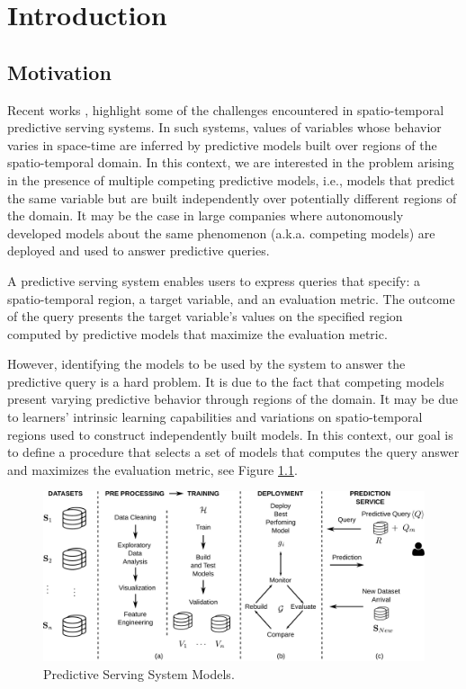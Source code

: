 \chapter[Introduction]{Introduction}\label{chap_intro}

\section{Motivation}
\label{Sec:Motivation}

Recent works \cite{Ghanta022019, Crankshaw2017, Polyzotis2018}, highlight some of the challenges encountered in spatio-temporal predictive serving systems. In such systems, values of variables whose behavior varies in space-time are inferred by predictive models built over regions of the spatio-temporal domain. In this context, we are interested in the problem arising in the presence of multiple competing predictive models, i.e., models that predict the same variable but are built independently over potentially different regions of the domain. It may be the case in large companies where autonomously developed models about the same phenomenon (a.k.a. competing models) are deployed and used to answer predictive queries. 

A predictive serving system enables users to express queries that specify: a spatio-temporal region, a target variable, and an evaluation metric. The outcome of the query presents the target variable's values on the specified region computed by predictive models that maximize the evaluation metric. 

However, identifying the  models to be used by the system to answer the predictive query is a hard problem. It is due to the fact that competing  models present varying predictive behavior through regions of the domain. It may be due to learners' intrinsic learning capabilities and variations on spatio-temporal regions used to construct independently built models. In this context, our goal is to define a procedure that selects a set of models that computes the query answer and maximizes the evaluation metric, see Figure \ref{Fig:MotiPoster}. 

\begin{figure}[h]
	\centering
	\includegraphics[scale=0.3]{../Figures/ModelManagementPS-VersionCompleta}
	\caption{Predictive Serving System Models.}
	\label{Fig:MotiPoster}
\end{figure}

